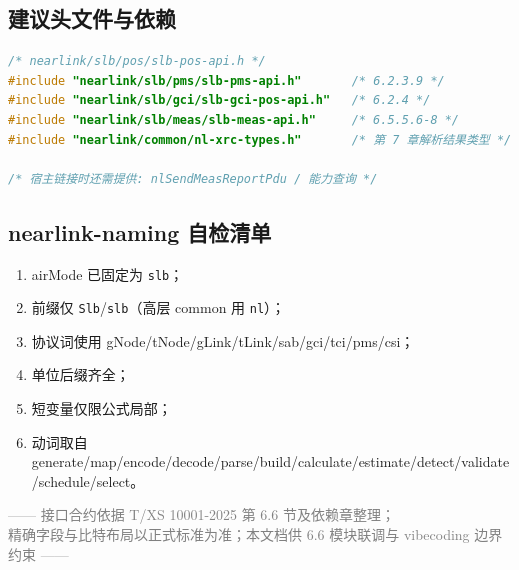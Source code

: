 \documentclass[11pt,a4paper]{ctexart}
\begin{document}
\subsection{建议头文件与依赖}

\begin{lstlisting}[language=C,caption={公共头依赖（示意）}]
/* nearlink/slb/pos/slb-pos-api.h */
#include "nearlink/slb/pms/slb-pms-api.h"       /* 6.2.3.9 */
#include "nearlink/slb/gci/slb-gci-pos-api.h"   /* 6.2.4 */
#include "nearlink/slb/meas/slb-meas-api.h"     /* 6.5.5.6-8 */
#include "nearlink/common/nl-xrc-types.h"       /* 第 7 章解析结果类型 */

/* 宿主链接时还需提供: nlSendMeasReportPdu / 能力查询 */
\end{lstlisting}

\subsection{nearlink-naming 自检清单}

\begin{enumerate}[nosep]
  \item airMode 已固定为 \texttt{slb}；
  \item 前缀仅 \texttt{Slb}/\texttt{slb}（高层 common 用 \texttt{nl}）；
  \item 协议词使用 gNode/tNode/gLink/tLink/sab/gci/tci/pms/csi；
  \item 单位后缀齐全；
  \item 短变量仅限公式局部；
  \item 动词取自 generate/map/encode/decode/parse/build/calculate/estimate/detect/validate/schedule/select。
\end{enumerate}

\vfill
\begin{center}
\small\textcolor{gray}{—— 接口合约依据 T/XS 10001-2025 第 6.6 节及依赖章整理；\\
精确字段与比特布局以正式标准为准；本文档供 6.6 模块联调与 vibecoding 边界约束 ——}
\end{center}
\end{document}
